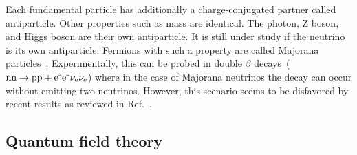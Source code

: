 
Each fundamental particle has additionally a charge-conjugated partner called antiparticle. Other properties such as mass are identical. The photon, Z boson, and Higgs boson are their own antiparticle. It is still under study if the neutrino is its own antiparticle. Fermions with such a property are called Majorana particles~\cite{Majorana2006}. Experimentally, this can be probed in double $\beta$ decays~($\mathrm{nn}\to\mathrm{pp}+\mathrm{e}^{\rmminus}\mathrm{e}^{\rmminus}\nu_\mathrm{e}\nu_\mathrm{e}$) where in the case of Majorana neutrinos the decay can occur without emitting two neutrinos. However, this scenario seems to be disfavored by recent results as reviewed in Ref.~\cite{Dell'Oro:2016dbc}.


\subsection{Quantum field theory}

